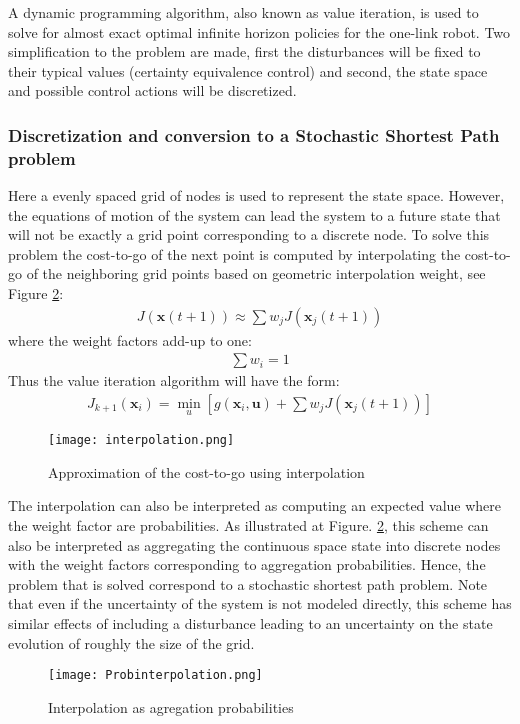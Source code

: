 A dynamic programming algorithm, also known as value iteration, is used to solve for almost exact optimal infinite horizon policies for the one-link robot. Two simplification to the problem are made, first the disturbances will be fixed to their typical values (certainty equivalence control) and second, the state space and possible control actions will be discretized.

\subsubsection{Discretization and conversion to a Stochastic Shortest Path problem}
\label{sec:ConvertionToAStocasticShortestPathProblem}

Here a evenly spaced grid of nodes is used to represent the state space. However, the equations of motion of the system can lead the system to a future state that will not be exactly a grid point corresponding to a discrete node. To solve this problem the cost-to-go of the next point is computed by interpolating the cost-to-go of the neighboring grid points based on geometric interpolation weight, see Figure \ref{fig:Probinterpolation}:
%
\begin{align}
	J(\boldsymbol{x}(t+1)) \approx \sum{ w_j J(\boldsymbol{x}_j(t+1)) } 
	\label{eq:interpol}
\end{align}
%
where the weight factors add-up to one:
%
\begin{align}
	 \sum{ w_i  } = 1
	\label{eq:w}
\end{align}
%
Thus the value iteration algorithm will have the form:
%
\begin{align}
	J_{k+1}(\boldsymbol{x}_i) =  \min_u{\left[ g(\boldsymbol{x}_i,\boldsymbol{u}) + \sum{ w_j J(\boldsymbol{x}_j(t+1))}  \right]}
	\label{eq:interpol}
\end{align}
%
\begin{figure}[htp]
	\centering
		\texttt{[image: interpolation.png]}
	\caption{Approximation of the cost-to-go using interpolation}
	\label{fig:interpolation}
\end{figure}
%
The interpolation can also be interpreted as computing an expected value where the weight factor are probabilities. As illustrated at Figure. \ref{fig:Probinterpolation}, this scheme can also be interpreted as aggregating the continuous space state into discrete nodes with the weight factors corresponding to aggregation probabilities. Hence, the problem that is solved correspond to a stochastic shortest path problem. Note that even if the uncertainty of the system is not modeled directly, this scheme has similar effects of including a disturbance leading to an uncertainty on the state evolution of roughly the size of the grid.  
%
\begin{figure}[htp]
	\centering
		\texttt{[image: Probinterpolation.png]}
	\caption{Interpolation as agregation probabilities}
	\label{fig:Probinterpolation}
\end{figure}


